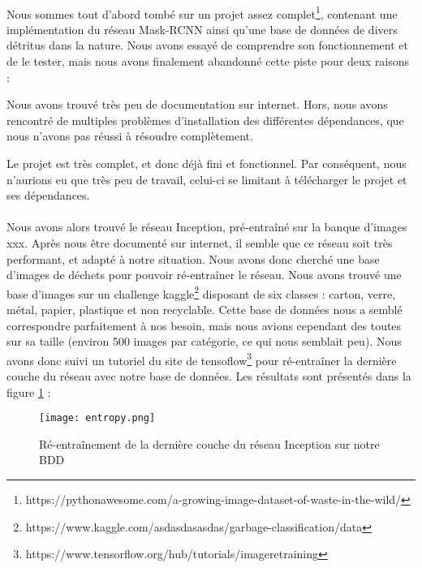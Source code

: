 \documentclass[11pt,a4paper,twocolumn]{article}
\begin{document}
\paragraph*{}

Nous sommes tout d’abord tombé sur un projet assez complet\footnote{https://pythonawesome.com/a-growing-image-dataset-of-waste-in-the-wild/}, contenant une implémentation du réseau Mask-RCNN ainsi qu’une base de données de divers détritus dans la nature. Nous avons essayé de comprendre son fonctionnement et de le tester, mais nous avons finalement abandonné cette piste pour deux raisons :

Nous avons trouvé très peu de documentation sur internet. Hors, nous avons rencontré de multiples problèmes d’installation des différentes dépendances, que nous n’avons pas réussi à résoudre complètement.

Le projet est très complet, et donc déjà fini et fonctionnel. Par conséquent, nous n’aurions eu que très peu de travail, celui-ci se limitant à télécharger le projet et ses dépendances.

\paragraph*{}

Nous avons alors trouvé le réseau Inception, pré-entraîné sur la banque d’images xxx. Après nous être documenté sur internet, il semble que ce réseau soit très performant, et adapté à notre situation.
Nous avons donc cherché une base d’images de déchets pour pouvoir ré-entraîner le réseau. Nous avons trouvé une base d’images sur un challenge kaggle\footnote{https://www.kaggle.com/asdasdasasdas/garbage-classification/data} disposant de six classes : carton, verre, métal, papier, plastique et non recyclable. Cette base de données nous a semblé correspondre parfaitement à nos besoin, mais nous avions cependant des toutes sur sa taille (environ 500 images par catégorie, ce qui nous semblait peu).
Nous avons donc suivi un tutoriel du site de tensoflow\footnote{https://www.tensorflow.org/hub/tutorials/image\textunderscore retraining} pour ré-entraîner la dernière couche du réseau avec notre base de données. Les résultats sont présentés dans la figure \ref{entropy} :

\begin{figure}[H]
	\center
	\texttt{[image: entropy.png]}
	\caption{Ré-entraînement de la dernière couche du réseau Inception sur notre BDD}
	\label{entropy}
\end{figure}
\end{document}
